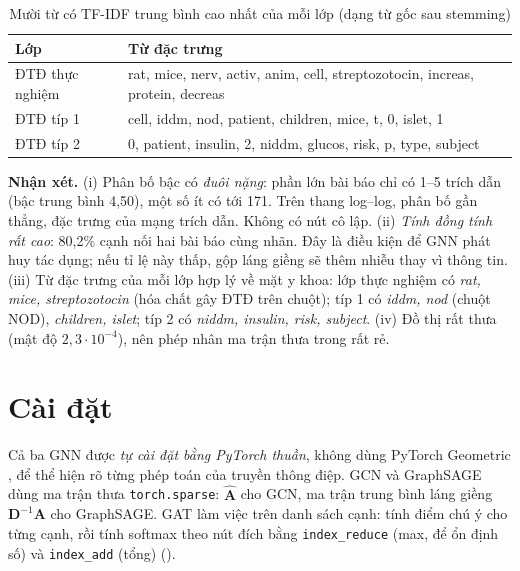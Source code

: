 \begin{table}[H]
\centering
\caption{Mười từ có TF-IDF trung bình cao nhất của mỗi lớp (dạng từ gốc sau stemming)}
\label{tab:pubmed-words}
\small
\begin{tabularx}{\linewidth}{@{}L{3.2cm}Y@{}}
\toprule
\textbf{Lớp} & \textbf{Từ đặc trưng} \\
\midrule
ĐTĐ thực nghiệm & rat, mice, nerv, activ, anim, cell, streptozotocin, increas, protein, decreas \\
ĐTĐ típ 1 & cell, iddm, nod, patient, children, mice, t, 0, islet, 1 \\
ĐTĐ típ 2 & 0, patient, insulin, 2, niddm, glucos, risk, p, type, subject \\
\bottomrule
\end{tabularx}
\end{table}


\textbf{Nhận xét.} (i) Phân bố bậc có \emph{đuôi nặng}: phần lớn bài báo chỉ có 1–5 trích dẫn (bậc trung bình 4,50), một số ít có tới 171. Trên thang log–log, phân bố gần thẳng, đặc trưng của mạng trích dẫn. Không có nút cô lập. (ii) \emph{Tính đồng tính rất cao}: 80,2\% cạnh nối hai bài báo cùng nhãn. Đây là điều kiện để GNN phát huy tác dụng; nếu tỉ lệ này thấp, gộp láng giềng sẽ thêm nhiễu thay vì thông tin. (iii) Từ đặc trưng của mỗi lớp hợp lý về mặt y khoa: lớp thực nghiệm có \emph{rat, mice, streptozotocin} (hóa chất gây ĐTĐ trên chuột); típ 1 có \emph{iddm, nod} (chuột NOD), \emph{children, islet}; típ 2 có \emph{niddm, insulin, risk, subject}. (iv) Đồ thị rất thưa (mật độ $2{,}3\cdot10^{-4}$), nên phép nhân ma trận thưa trong  rất rẻ.

\section{Cài đặt}

Cả ba GNN được \emph{tự cài đặt bằng PyTorch thuần}, không dùng PyTorch Geometric \cite{fey2019pyg}, để thể hiện rõ từng phép toán của truyền thông điệp. GCN và GraphSAGE dùng ma trận thưa \texttt{torch.sparse}: $\hat{\mathbf A}$ cho GCN, ma trận trung bình láng giềng $\mathbf D^{-1}\mathbf A$ cho GraphSAGE. GAT làm việc trên danh sách cạnh: tính điểm chú ý cho từng cạnh, rồi tính softmax theo nút đích bằng \texttt{index\_reduce} (max, để ổn định số) và \texttt{index\_add} (tổng) ().

